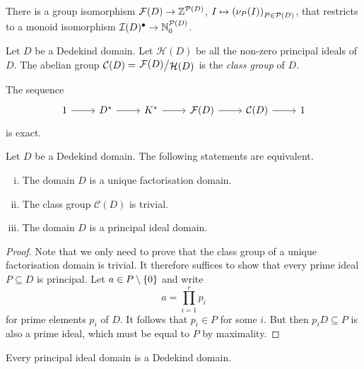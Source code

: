 \begin{izrek}
There is a group isomorphism
$\mathcal{F}(D) \to \mathbb{Z}^{\mathcal{P}(D)}$,
$I \mapsto \left(\nu_P(I)\right)_{P \in \mathcal{P}(D)}$, that restricts to
a monoid isomorphism
$\mathcal{I}(D)^\bullet \to \mathbb{N}_0^{\mathcal{P}(D)}$.
\end{izrek}

\begin{definicija}
Let $D$ be a Dedekind domain. Let $\mathcal{H}(D)$ be all the
non-zero principal ideals of $D$. The abelian group
$\mathcal{C}(D) = \kvoc{\mathcal{F}(D)}{\mathcal{H}(D)}$ is the
\emph{class group} of $D$.
\end{definicija}

\begin{opomba}
The sequence
\[
\begin{tikzcd}
1 \arrow[r] &
D^* \arrow[r] &
K^* \arrow[r] &
\mathcal{F}(D) \arrow[r] &
\mathcal{C}(D) \arrow[r] &
1
\end{tikzcd}
\]
is exact.
\end{opomba}


\begin{izrek}
Let $D$ be a Dedekind domain. The following statements are
equivalent.

\begin{enumerate}[i)]
\item The domain $D$ is a unique factorisation domain.
\item The class group $\mathcal{C}(D)$ is trivial.
\item The domain $D$ is a principal ideal domain.
\end{enumerate}
\end{izrek}

\begin{proof}
Note that we only need to prove that the class group of a unique
factorisation domain is trivial. It therefore suffices to show that
every prime ideal $P \subseteq D$ is principal. Let
$a \in P \setminus \left\{0\right\}$ and write
\[
a = \prod_{i=1}^r p_i
\]
for prime elements $p_i$ of $D$. It follows that $p_i \in P$ for
some $i$. But then $p_i D \subseteq P$ is also a prime ideal, which
must be equal to $P$ by maximality.
\end{proof}

\begin{trditev}
Every principal ideal domain is a Dedekind domain.
\end{trditev}

